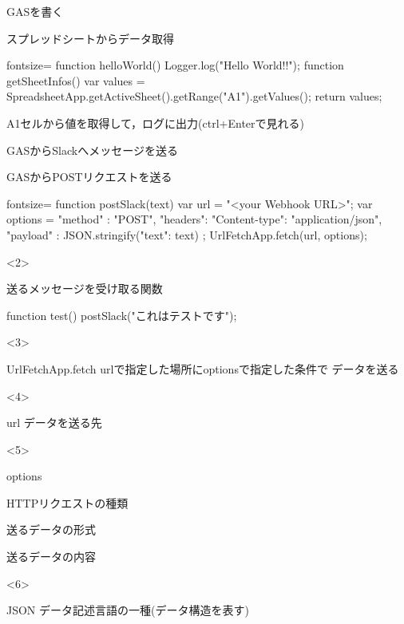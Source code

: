 \documentclass[dvipdfmx,xcolor={svgnames}]{beamer}
\begin{document}
  \begin{frame}[fragile]{GASを書く}
    \begin{exampleblock}{スプレッドシートからデータ取得}
      \begin{GAS*}{fontsize=\scriptsize}
function helloWorld(){
  Logger.log("Hello World!!");
}
function getSheetInfos(){
  var values = SpreadsheetApp.getActiveSheet().getRange("A1").getValues();
  return values;
}
      \end{GAS*}
    \end{exampleblock}
    \LARGE A1セルから値を取得して，ログに出力(ctrl+Enterで見れる)
  \end{frame}
  \begin{frame}[fragile]{GASからSlackへメッセージを送る}
    \begin{exampleblock}{GASからPOSTリクエストを送る}
      \begin{GAS*}{fontsize=\small}
function postSlack(text){
  var url = "<your Webhook URL>";
  var options = {
    "method" : "POST",
    "headers": {"Content-type": "application/json"},
    "payload" : JSON.stringify({"text": text})
  };
  UrlFetchApp.fetch(url, options);
}
      \end{GAS*}
    \end{exampleblock}
    \begin{onlyenv}<2>
      \begin{exampleblock}{送るメッセージを受け取る関数}
        \begin{GAS}
function test(){
  postSlack("これはテストです");
}
        \end{GAS}
      \end{exampleblock}
    \end{onlyenv}
    \begin{onlyenv}<3>
      \begin{block}{UrlFetchApp.fetch}
        urlで指定した場所にoptionsで指定した条件で
        データを送る
      \end{block}
    \end{onlyenv}
    \begin{onlyenv}<4>
      \begin{block}{url}
        データを送る先
      \end{block}
    \end{onlyenv}
    \begin{onlyenv}<5>
      \begin{block}{options}
        \begin{description}\normalsize
          \item[method] HTTPリクエストの種類
          \item[headers] 送るデータの形式
          \item[payload] 送るデータの内容
        \end{description}
      \end{block}
    \end{onlyenv}
    \begin{onlyenv}<6>
      \begin{block}{JSON}
        データ記述言語の一種(データ構造を表す)
      \end{block}
    \end{onlyenv}
  \end{frame}
\end{document}
